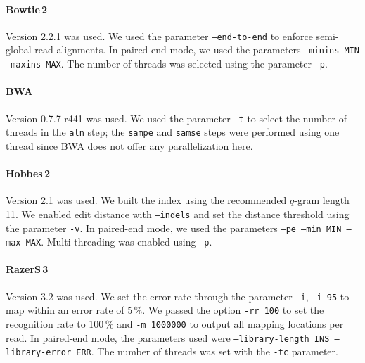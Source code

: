 \paragraph{Bowtie\,2}
Version 2.2.1 was used.
We used the parameter \texttt{--end-to-end} to enforce semi-global read alignments.
In paired-end mode, we used the parameters \texttt{--minins MIN --maxins MAX}.
The number of threads was selected using the parameter \texttt{-p}.

\paragraph{BWA}
Version 0.7.7-r441 was used.
We used the parameter \texttt{-t} to select the number of threads in the \texttt{aln} step;
the \texttt{sampe} and \texttt{samse} steps were performed using one thread since BWA does not offer any parallelization here.

\paragraph{Hobbes\,2}
Version 2.1 was used.
We built the index using the recommended $q$-gram length 11.
We enabled edit distance with \texttt{--indels} and set the distance threshold using the parameter \texttt{-v}.
In paired-end mode, we used the parameters \texttt{--pe --min MIN --max MAX}.
Multi-threading was enabled using \texttt{-p}.

\paragraph{RazerS\,3}
Version 3.2 was used.
We set the error rate through the parameter \texttt{-i}, \eg \texttt{-i 95} to map within an error rate of 5\,\%.
We passed the option \texttt{-rr 100} to set the recognition rate to 100\,\% and \texttt{-m 1000000} to output all mapping locations per read.
In paired-end mode, the parameters used were \texttt{--library-length INS --library-error ERR}.
The number of threads was set with the \texttt{-tc} parameter.
